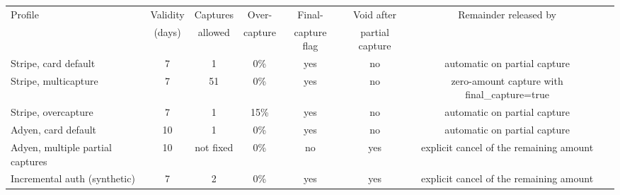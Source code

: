 \begin{tabular}{lccccccl}
\toprule
Profile & Validity & Captures & Over- & Final- & Void after & Remainder released by \\
        & (days)   & allowed  & capture & capture flag & partial capture & \\
\midrule
Stripe, card default & 7 & 1 & 0\% & yes & no & automatic on partial capture \\
Stripe, multicapture & 7 & 51 & 0\% & yes & no & zero-amount capture with final\_capture=true \\
Stripe, overcapture & 7 & 1 & 15\% & yes & no & automatic on partial capture \\
Adyen, card default & 10 & 1 & 0\% & yes & no & automatic on partial capture \\
Adyen, multiple partial captures & 10 & not fixed & 0\% & no & yes & explicit cancel of the remaining amount \\
Incremental auth (synthetic) & 7 & 2 & 0\% & yes & yes & explicit cancel of the remaining amount \\
\bottomrule
\end{tabular}
